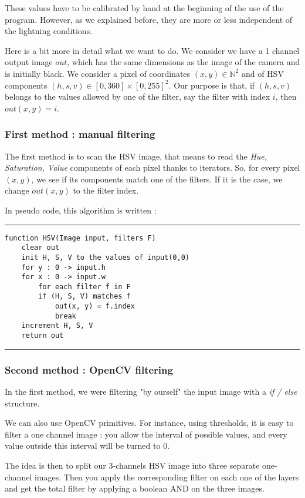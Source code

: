 \documentclass{article}
\newcommand{\N} {\mathbb N}
\begin{document}
These values have to be calibrated by hand at the beginning of the use of the program.
However, as we explained before, they are more or less independent of the lightning conditions.

Here is a bit more in detail what we want to do.
We consider we have a 1 channel output image $out$,
which has the same dimensions as the image of the camera
and is initially black.
We consider a pixel of coordinates $(x, y) \in \N^2$
and of HSV components $(h, s, v) \in [0, 360] \times [0, 255]^2$.
Our purpose is that, if $(h, s, v)$ belongs to the values allowed by one of the filter,
say the filter with index $i$,
then $out(x, y) = i$.

            \subsubsection{First method : manual filtering}

The first method is to scan the HSV image, that means to read the \textit{Hue, Saturation, Value}
components of each pixel thanks to iterators.
So, for every pixel $(x, y)$,
we see if its components match one of the filters.
If it is the case, we change $out(x, y)$ to the filter index.

In pseudo code, this algorithm is written :
\hrule
\begin{verbatim}
function HSV(Image input, filters F)
    clear out
    init H, S, V to the values of input(0,0)
    for y : 0 -> input.h
    for x : 0 -> input.w
        for each filter f in F
        if (H, S, V) matches f
            out(x, y) = f.index
            break
    increment H, S, V
    return out
\end{verbatim}
\hrule\vspace*{.5 cm}


            \subsubsection{Second method : OpenCV filtering}

In the first method, we were filtering "by ourself" the input image
with a \textit{if / else} structure.

We can also use OpenCV primitives.
For instance, using thresholds, it is easy to filter a one channel image :
you allow the interval of possible values,
and every value outside this interval will be turned to 0.

The idea is then to split our 3-channels HSV image into three separate one-channel images.
Then you apply the corresponding filter on each one of the layers
and get the total filter by applying a boolean AND
on the three images.
\end{document}
